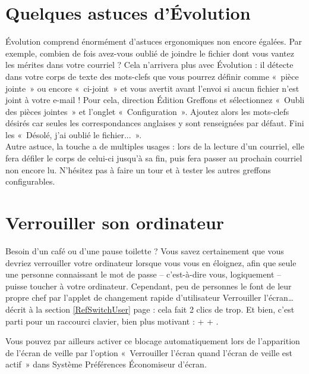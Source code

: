 \section{Quelques astuces d'Évolution}
Évolution comprend énormément d'astuces ergonomiques non encore égalées. Par exemple, combien de fois avez-vous oublié de joindre le fichier dont vous vantez les mérites dans votre courriel ? Cela n'arrivera plus avec Évolution : il détecte dans votre corps de texte des mots-clefs que vous pourrez définir comme «~pièce jointe~» ou encore «~ci-joint~» et vous avertit avant l'envoi si aucun fichier n'est joint à votre e-mail ! Pour cela, direction Édition \FlecheDroite Greffons et sélectionnez «~Oubli des pièces jointes~» et l'onglet «~Configuration~». Ajoutez alors les mots-clefs désirés car seules les correspondances anglaises y sont renseignées par défaut. Fini les «~Désolé, j'ai oublié le fichier...~».\\
Autre astuce, la touche  a de multiples usages : lors de la lecture d'un courriel, elle fera défiler le corps de celui-ci jusqu'à sa fin, puis fera passer au prochain courriel non encore lu. N'hésitez pas à faire un tour et à tester les autres greffons configurables.
\section{Verrouiller son ordinateur}
\label{RefVerrouillageOrdi}
Besoin d'un café ou d'une pause toilette ? Vous savez certainement que vous devriez verrouiller votre ordinateur lorsque vous vous en éloignez, afin que seule une personne connaissant le mot de passe -- c'est-à-dire vous, logiquement -- puisse toucher à votre ordinateur. Cependant, peu de personnes le font de leur propre chef par l'applet de changement rapide d'utilisateur \FlecheDroite Verrouiller l'écran\ldots{} décrit à la section \ref{RefSwitchUser} page \pageref{RefSwitchUser} : cela fait 2 clics de trop. Et bien, c'est parti pour un raccourci clavier, bien plus motivant :  +  + .\par
Vous pouvez par ailleurs activer ce blocage automatiquement lors de l'apparition de l'écran de veille par l'option «~Verrouiller l'écran quand l'écran de veille est actif~» dans Système \FlecheDroite Préférences \FlecheDroite Économiseur d'écran.
